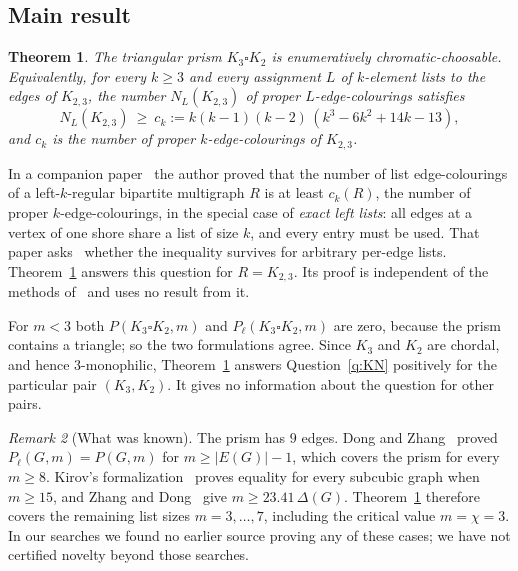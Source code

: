 \documentclass[11pt]{amsart}
\newtheorem{theorem}{Theorem}[section]
\theoremstyle{definition}
\theoremstyle{remark}
\newtheorem{remark}[theorem]{Remark}
\newcommand{\Pl}{P_\ell}
\newcommand{\1}{\mathbf 1}
\begin{document}
\subsection*{Main result}
\begin{theorem}\label{thm:main}
The triangular prism $K_3\square K_2$ is enumeratively chromatic-choosable. Equivalently, for every
$k\ge 3$ and every assignment $L$ of $k$-element lists to the edges of $K_{2,3}$, the number
$N_L(K_{2,3})$ of proper $L$-edge-colourings satisfies
\begin{equation}\label{eq:main}
N_L(K_{2,3})\ \ge\ c_k:=k(k-1)(k-2)\,(k^3-6k^2+14k-13),
\end{equation}
and $c_k$ is the number of proper $k$-edge-colourings of $K_{2,3}$.
\end{theorem}

In a companion paper~\cite{TagueExact} the author proved that the number of list edge-colourings of a
left-$k$-regular bipartite multigraph $R$ is at least $c_k(R)$, the number of proper
$k$-edge-colourings, in the special case of \emph{exact left lists}: all edges at a vertex of one shore
share a list of size $k$, and every entry must be used. That paper asks~\cite[Question~11.4]{TagueExact} whether the inequality survives for arbitrary per-edge lists.
Theorem~\ref{thm:main} answers this question for $R=K_{2,3}$. Its proof is independent of the methods
of~\cite{TagueExact} and uses no result from it.

For $m<3$ both $P(K_3\square K_2,m)$ and $\Pl(K_3\square K_2,m)$ are zero, because the prism contains
a triangle; so the two formulations agree. Since $K_3$ and $K_2$ are chordal, and hence $3$-monophilic,
Theorem~\ref{thm:main} answers Question~\ref{q:KN} positively for the particular pair
$(K_3,K_2)$. It gives no information about the question for other pairs.

\begin{remark}[What was known]\label{rem:known}
The prism has $9$ edges. Dong and Zhang~\cite{DZ23} proved $\Pl(G,m)=P(G,m)$ for
$m\ge |E(G)|-1$, which covers the prism for every $m\ge 8$. Kirov's formalization~\cite{KirovLean}
proves equality for every subcubic graph when $m\ge 15$, and Zhang and Dong~\cite{ZD26} give
$m\ge 23.41\,\Delta(G)$. Theorem~\ref{thm:main} therefore covers the remaining list sizes $m=3,\dots,7$, including
the critical value $m=\chi=3$. In our searches we found no earlier source proving any of these cases;
we have not certified novelty beyond those searches.
\end{remark}
\end{document}

